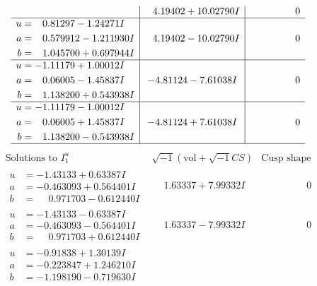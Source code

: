 \documentclass[1p]{elsarticle_modified}
\theoremstyle{definition}
\newcommand{\I}{\sqrt{-1}}
\begin{document}
$$\begin{array}{c|c|c}
 & \phantom{-}4.19402 + 10.02790 I & \phantom{-0.000000 } 0 \\ \hline\begin{aligned}
u &= \phantom{-}0.81297 - 1.24271 I \\
a &= \phantom{-}0.579912 - 1.211930 I \\
b &= \phantom{-}1.045700 + 0.697944 I\end{aligned}
 & \phantom{-}4.19402 - 10.02790 I & \phantom{-0.000000 } 0 \\ \hline\begin{aligned}
u &= -1.11179 + 1.00012 I \\
a &= \phantom{-}0.06005 - 1.45837 I \\
b &= \phantom{-}1.138200 + 0.543938 I\end{aligned}
 & -4.81124 - 7.61038 I & \phantom{-0.000000 } 0 \\ \hline\begin{aligned}
u &= -1.11179 - 1.00012 I \\
a &= \phantom{-}0.06005 + 1.45837 I \\
b &= \phantom{-}1.138200 - 0.543938 I\end{aligned}
 & -4.81124 + 7.61038 I & \phantom{-0.000000 } 0\\
 \hline 
 \end{array}$$\newpage$$\begin{array}{c|c|c}  
\text{Solutions to }I^u_{1}& \I (\text{vol} + \sqrt{-1}CS) & \text{Cusp shape}\\
 \hline 
\begin{aligned}
u &= -1.43133 + 0.63387 I \\
a &= -0.463093 + 0.564401 I \\
b &= \phantom{-}0.971703 - 0.612440 I\end{aligned}
 & \phantom{-}1.63337 + 7.99332 I & \phantom{-0.000000 } 0 \\ \hline\begin{aligned}
u &= -1.43133 - 0.63387 I \\
a &= -0.463093 - 0.564401 I \\
b &= \phantom{-}0.971703 + 0.612440 I\end{aligned}
 & \phantom{-}1.63337 - 7.99332 I & \phantom{-0.000000 } 0 \\ \hline\begin{aligned}
u &= -0.91838 + 1.30139 I \\
a &= -0.223847 + 1.246210 I \\
b &= -1.198190 - 0.719630 I\end{aligned}

\end{array}$$
\end{document}
